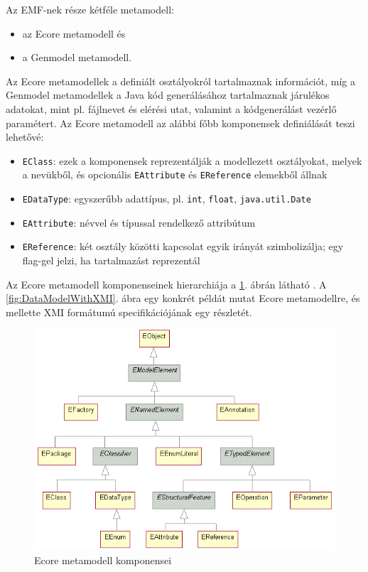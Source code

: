 Az \gls{EMF}-nek része kétféle metamodell:
\begin{itemize}
	\item az Ecore metamodell és 
	\item a Genmodel metamodell.
\end{itemize}
Az Ecore metamodellek a definiált osztályokról tartalmaznak információt, míg a Genmodel metamodellek a Java kód generálásához tartalmaznak járulékos adatokat, mint pl. fájlnevet és elérési utat, valamint a kódgenerálást vezérlő paramétert.
Az Ecore metamodell az alábbi főbb komponensek definiálását teszi lehetővé:
\begin{itemize}
	\item \texttt{EClass}: ezek a komponensek reprezentálják a modellezett osztályokat, melyek a nevükből, és opcionális \texttt{EAttribute} és \texttt{EReference} elemekből állnak
	\item \texttt{EDataType}: egyszerűbb adattípus, pl. \texttt{int}, \texttt{float}, \texttt{java.util.Date}
	\item \texttt{EAttribute}: névvel és típussal rendelkező attribútum
	\item \texttt{EReference}: két osztály közötti kapcsolat egyik irányát szimbolizálja; egy flag-gel jelzi, ha tartalmazást reprezentál
\end{itemize}
Az Ecore metamodell komponenseinek hierarchiája a \ref{fig:EcoreStruct}. ábrán látható \cite{EclipseOrgEcoreDoc}.
A \ref{fig:DataModelWithXMI}. ábra egy konkrét példát mutat Ecore metamodellre, és mellette \gls{XMI} formátumú specifikációjának egy részletét.
\begin{figure}[htb]
\centering
\includegraphics[width=\textwidth]{figures/ecore-hierarchy.png}
\caption{Ecore metamodell komponensei}
\label{fig:EcoreStruct}
\end{figure}
